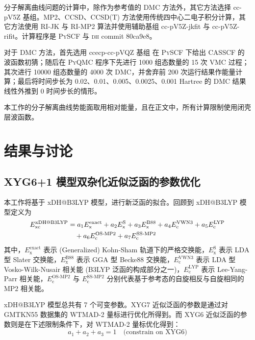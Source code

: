 分子解离曲线问题的计算中，除作为参考值的 DMC 方法外，其它方法选择 cc-pV5Z 基组。MP2、CCSD、CCSD(T) 方法使用传统四中心二电子积分计算，其它方法使用 RI-JK 与 RI-MP2 算法并使用辅助基组 cc-pV5Z-jkfit 与 cc-pV5Z-rifit。计算程序是 \textsc{PySCF} 与 \textsc{dh} commit 80ca9e8。

对于 DMC 方法，首先选用 ccecp-cc-pVQZ 基组\cite{Bennett-Mitas.JCP.2017} 在 \textsc{PySCF} 下给出 CASSCF 的波函数初猜；随后在 \textsc{PyQMC} 程序\cite{Wheeler-Wagner.JCP.2023}下先进行 1000 组态数量的 15 次 VMC 过程；其次进行 10000 组态数量的 4000 次 DMC，并舍弃前 200 次运行结果作能量计算；最后将时间步长为 0.02、0.01、0.005、0.0025、0.001 Hartree 的 DMC 结果线性外推到 0 时间步长的情形。

本工作的分子解离曲线势能面取用相对能量，且在正文中，所有计算限制使用闭壳层波函数。

\section{结果与讨论}
\label{sec.2.iepa-results}

\subsection{XYG6+1 模型双杂化近似泛函的参数优化}

本工作将基于 xDH@B3LYP 模型\cite{Zhang-Xu.JPCL.2021}，进行新泛函的拟合。回顾到 xDH@B3LYP 模型定义为
\begin{align}
  E_\mathrm{xc}^\text{xDH@B3LYP} &= a_1 E_\mathrm{x}^\mathrm{exact} + a_2 E_\mathrm{x}^\mathrm{S} + a_3 E_\mathrm{x}^\mathrm{B88} + a_4 E_\mathrm{c}^\mathrm{VWN3} + a_5 E_\mathrm{c}^\mathrm{LYP} \notag \\
  &\quad + a_6 E_\mathrm{c}^\text{OS-MP2} + a_7 E_\mathrm{c}^\text{SS-MP2}
\end{align}
其中，$E_\mathrm{x}^\mathrm{exact}$ 表示 (Generalized) Kohn-Sham 轨道下的严格交换能，$E_\mathrm{x}^\mathrm{S}$ 表示 LDA 型 Slater 交换能\cite{Bloch-Bloch.ZP.1929,Dirac-Dirac.MPCPS.1930}，$E_\mathrm{x}^\mathrm{B88}$ 表示 GGA 型 Becke88 交换能\cite{Becke-Becke.PRA.1988}，$E_\mathrm{c}^\mathrm{VWN3}$ 表示 LDA 型 Vosko-Wilk-Nusair 相关能\cite{Vosko-Nusair.CJP.1980} (B3LYP 泛函的构成部分之一\cite{Becke-Becke.JCP.1993,Stephens-Frisch.JPC.1994})，$E_\mathrm{c}^\mathrm{LYP}$ 表示 Lee-Yang-Parr 相关能\cite{Lee-Parr.PRB.1988}，$E_\mathrm{c}^\text{OS-MP2}$ 与 $E_\mathrm{c}^\text{SS-MP2}$ 分别代表基于参考态的自旋相反与自旋相同的 MP2 相关能。

xDH@B3LYP 模型总共有 7 个可变参数。XYG7 近似泛函的参数是通过对 GMTKN55 数据集的 WTMAD-2 量标进行优化所得到。而 XYG6 近似泛函的参数则是在下述限制条件下，对 WTMAD-2 量标优化得到：
\begin{equation}
  \label{eq.2.constrain-xyg6}
  a_1 + a_2 + a_3 = 1 \quad \text{(constrain on XYG6)}
\end{equation}

